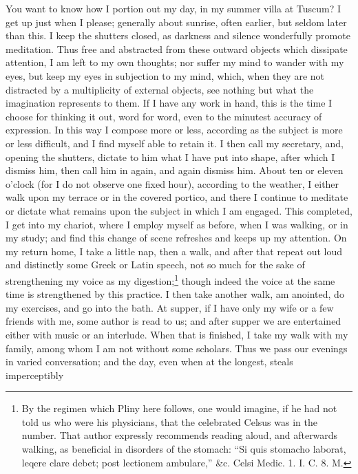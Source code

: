 
You want to know how I portion out my day, in my summer villa at Tuscum? I
get up just when I please; generally about sunrise, often earlier, but
seldom later than this. I keep the shutters closed, as darkness and
silence wonderfully promote meditation. Thus free and abstracted from
these outward objects which dissipate attention, I am left to my own
thoughts; nor suffer my mind to wander with my eyes, but keep my eyes in
subjection to my mind, which, when they are not distracted by a
multiplicity of external objects, see nothing but what the imagination
represents to them. If I have any work in hand, this is the time I choose
for thinking it out, word for word, even to the minutest accuracy of
expression. In this way I compose more or less, according as the subject
is more or less difficult, and I find myself able to retain it. I then
call my secretary, and, opening the shutters, dictate to him what I have
put into shape, after which I dismiss him, then call him in again, and
again dismiss him. About ten or eleven o'clock (for I do not observe one
fixed hour), according to the weather, I either walk upon my terrace or in
the covered portico, and there I continue to meditate or dictate what
remains upon the subject in which I am engaged. This completed, I get into
my chariot, where I employ myself as before, when I was walking, or in my
study; and find this change of scene refreshes and keeps up my attention.
On my return home, I take a little nap, then a walk, and after that repeat
out loud and distinctly some Greek or Latin speech, not so much for the
sake of strengthening my voice as my digestion;\footnote{By the regimen which
Pliny here follows, one would imagine, if he had not told us who were his
physicians, that the celebrated Celsus was in the number. That author
expressly recommends reading aloud, and afterwards walking, as beneficial
in disorders of the stomach: ``Si quis stomacho laborat, leqere clare
debet; post lectionem ambulare,'' \&c. Celsi Medic. 1. I. C. 8. M.} though indeed the
voice at the same time is strengthened by this practice. I then take
another walk, am anointed, do my exercises, and go into the bath. At
supper, if I have only my wife or a few friends with me, some author is
read to us; and after supper we are entertained either with music or an
interlude. When that is finished, I take my walk with my family, among
whom I am not without some scholars. Thus we pass our evenings in varied
conversation; and the day, even when at the longest, steals imperceptibly
